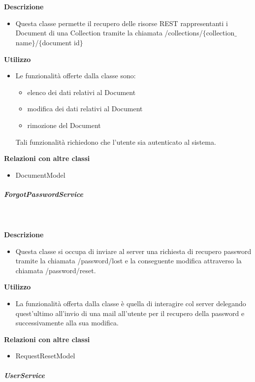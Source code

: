         \textbf{\\ \\ Descrizione} 
          \begin{itemize}
            \item[] Questa classe permette il recupero delle risorse REST rappresentanti i Document di una Collection tramite la chiamata /collections/$\{$collection$\_$name$\}$/$\{$document id$\}$
          \end{itemize}      
        \textbf{Utilizzo}  
          \begin{itemize}
            \item[] Le funzionalità offerte dalla classe sono: 
\begin{itemize} 
\item elenco dei dati relativi al Document 
\item modifica dei dati relativi al Document
\item rimozione del Document 
\end{itemize} 
Tali funzionalità richiedono che l'utente sia autenticato al sistema.
          \end{itemize}
          \textbf{Relazioni con altre classi}
          \begin{itemize}
              \item{DocumentModel}
          \end{itemize}
      \subparagraph{ForgotPasswordService}
        
        \textbf{\\ \\ Descrizione} 
          \begin{itemize}
            \item[] Questa classe si occupa di inviare al server una richiesta di recupero password tramite la chiamata /password/lost e la conseguente modifica attraverso la chiamata /password/reset.
          \end{itemize}      
        \textbf{Utilizzo}  
          \begin{itemize}
            \item[] La  funzionalità offerta dalla classe è quella di interagire col server delegando quest'ultimo all'invio di una mail all'utente per il recupero della password e successivamente alla sua modifica.
          \end{itemize}
          \textbf{Relazioni con altre classi}
          \begin{itemize}
              \item{RequestResetModel}
          \end{itemize}
      \subparagraph{UserService}
        
